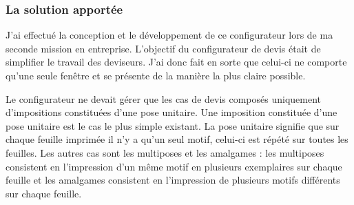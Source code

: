 \subsubsection{La solution apportée}

J'ai effectué la conception et le développement de ce configurateur lors de ma seconde mission en entreprise.
L'objectif du configurateur de devis était de simplifier le travail des deviseurs.
J'ai donc fait en sorte que celui-ci ne comporte qu'une seule fenêtre et se présente de la manière la plus claire possible.

Le configurateur ne devait gérer que les cas de devis composés uniquement d'impositions constituées d'une pose unitaire.
Une imposition constituée d'une pose unitaire est le cas le plus simple existant.
La pose unitaire signifie que sur chaque feuille imprimée il n'y a qu'un seul motif, celui-ci est répété sur toutes les feuilles.
Les autres cas sont les multiposes et les amalgames : les multiposes consistent en l'impression d'un même motif en plusieurs exemplaires sur chaque feuille et les amalgames consistent en l'impression de plusieurs motifs différents sur chaque feuille.

